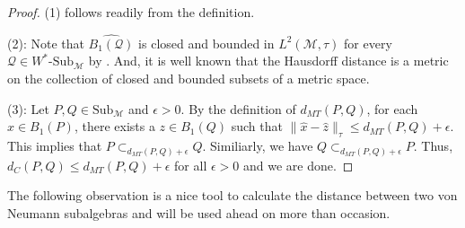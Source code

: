 \documentclass{amsart}
\numberwithin{equation}{section}
\newcommand{\1}{\mathbf{1}}
\newcommand{\mM}{\mathcal{M}}
\newcommand{\mQ}{\mathcal{Q}}
\begin{document}
\begin{proof}
  (1) follows readily from the definition.\smallskip
  

  (2): Note that $\widehat{B_1(\mQ)}$ is closed and bounded in $L^2(\mM,
  \tau)$ for every $\mQ \in W^*\text{-Sub}_{\mM}$ by
    . And, it is well known that the Hausdorff distance is a metric on the collection of closed and bounded subsets of a metric space.\smallskip


(3): Let $P, Q \in \text{Sub}_{\mM}$ and $\epsilon >
0$. By the definition of $d_{MT}(P,Q)$, for each $x \in B_{1}(P)$,
there exists a $z \in B_{1}(Q)$ such that
$\|\widehat{x}-\widehat{z}\|_{\tau}\leq d_{MT}(P,Q) + \epsilon$. This implies
that $ P \subset_{d_{MT}(P,Q) + \epsilon} Q$. Similiarly, we have $ Q
\subset_{d_{MT}(P,Q) + \epsilon }P $. Thus, \( d_C(P,Q)\leq
d_{MT}(P,Q) +\epsilon \) for all $\epsilon > 0$ and we are done.
\color{black}
\end{proof}

The following observation is a nice tool to calculate the distance
between two von Neumann subalgebras and will be used ahead on more
than occasion.
\end{document}
